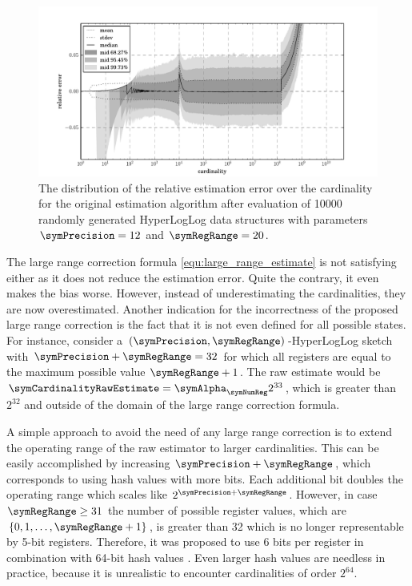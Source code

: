 \documentclass[a4paper]{scrartcl}
\begin{document}
\begin{figure}
\centering
\includegraphics[width=1\textwidth]{original_estimate}
\caption{The distribution of the relative estimation error over the cardinality for the original estimation algorithm after evaluation of \num{10000} randomly generated HyperLogLog data structures with parameters $\symPrecision = 12$ and $\symRegRange=20$.}
\label{fig:original_estimate}
\end{figure}

The large range correction formula \eqref{equ:large_range_estimate} is not satisfying either as it does not reduce the estimation error. Quite the contrary, it even makes the bias worse. However, instead of underestimating the cardinalities, they are now overestimated. Another indication for the incorrectness of the proposed large range correction is the fact that it is not even defined for all possible states. For instance, consider a $(\symPrecision,\symRegRange)$-HyperLogLog sketch with $\symPrecision+\symRegRange=32$ for which all registers are equal to the maximum possible value $\symRegRange+1$. The raw estimate would be $\symCardinalityRawEstimate = \symAlpha_\symNumReg 2^{33}$, which is greater than $2^{32}$ and outside of the domain of the large range correction formula.

A simple approach to avoid the need of any large range correction is to extend the operating range of the raw estimator to larger cardinalities. This can be easily accomplished by increasing $\symPrecision+\symRegRange$, which corresponds to using hash values with more bits. Each additional bit doubles the operating range which scales like $2^{\symPrecision+\symRegRange}$. However, in case $\symRegRange \geq 31$ the number of possible register values, which are $\lbrace 0, 1, \ldots, \symRegRange+1\rbrace$, is greater than 32 which is no longer representable by 5-bit registers. Therefore, it was proposed to use 6 bits per register in combination with 64-bit hash values \cite{Heule2013}. Even larger hash values are needless in practice, because it is unrealistic to encounter cardinalities of order $2^{64}$.
\end{document}
